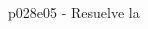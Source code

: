 \documentclass[spanish, 11pt]{exam}
\begin{document}
\begin{questions}
\begin{multicols}{2}
\begin{parts}
        \end{parts}
        \end{multicols}
        \question p028e05 - Resuelve la
\end{questions}
\end{document}
